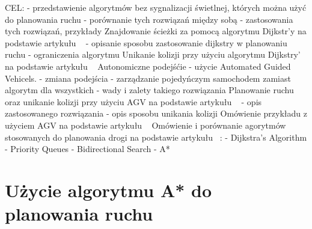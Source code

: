 CEL:
\newline
- przedstawienie algorytmów bez sygnalizacji świetlnej, których można użyć do planowania ruchu
\newline
- porównanie tych rozwiązań między sobą
\newline
- zastosowania tych rozwiązań, przykłady
\newline
\newline
Znajdowanie ścieżki za pomocą algorytmu Dijkstr'y na podstawie artykułu ~\cite{shaikh2013agv} 
\newline
- opisanie sposobu zastosowanie dijkstry w planowaniu ruchu
\newline
- ograniczenia algorytmu
\newline
\newline
Unikanie kolizji przy użyciu algorytmu Dijkstry' na podstawie artykułu ~\cite{shaikh2013agv} 
\newline
\newline
Autonomiczne podejśćie - użycie Automated Guided Vehicels.
\newline
- zmiana podejścia - zarządzanie pojedyńczym samochodem zamiast algorytm dla wszystkich
\newline
- wady i zalety takiego rozwiązania
\newline
\newline
Planowanie ruchu oraz unikanie kolizji przy użyciu AGV na podstawie artykułu ~\cite{szczerba2000robust}
\newline
- opis zastosowanego rozwiązania
\newline
- opis sposobu unikania kolizji
\newline
\newline
Omówienie przykładu z użyciem AGV na podstawie artykułu ~\cite{szczerba2000robust}
\newline
\newline
Omówienie i porównanie agorytmów stosowanych do planowania drogi na podstawie artykułu ~\cite{delling2009engineering}:
  \newline
  - Dijkstra's Algorithm
  \newline
  - Priority Queues
  \newline
  - Bidirectional Search
  \newline
  - A*
  \newline
\newline
\newline

\section{Użycie algorytmu A* do planowania ruchu}

